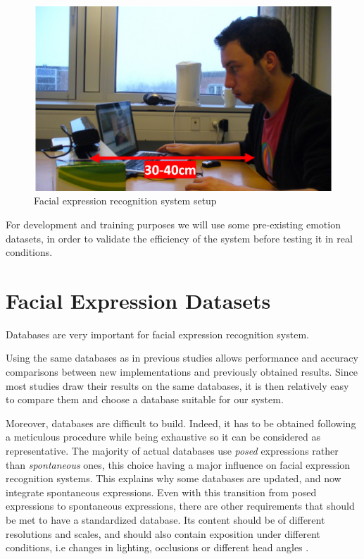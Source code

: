 \begin{figure}[!h]
\begin{center}
\noindent \includegraphics[scale=0.6]{figures/system_setup} 
\newline
\caption{Facial expression recognition system setup}
\label{system_setup}
\end{center} 
\end{figure}

\noindent For development and training purposes we will use some pre-existing emotion datasets, in order to validate the efficiency of the system before testing it in real conditions.
\newline

\section{Facial Expression Datasets}

\vspace{\baselineskip}
\noindent Databases are very important for facial expression recognition system.
\newline

\noindent Using the same databases as in previous studies allows performance and accuracy comparisons between new implementations and previously obtained results. Since most studies draw their results on the same databases, it is then relatively easy to compare them and choose a database suitable for our system.
\newline

\noindent Moreover, databases are difficult to build. Indeed, it has to be obtained following a meticulous procedure while being exhaustive so it can be considered as representative. The majority of actual databases use \textit{posed} expressions rather than \textit{spontaneous} ones, this choice having a major influence on facial expression recognition systems. This explains why some databases are updated, and now integrate spontaneous expressions. Even with this transition from posed expressions to spontaneous expressions, there are other requirements that should be met to have a standardized database. Its content should be of different resolutions and scales, and should also contain exposition under different conditions, i.e changes in lighting, occlusions or different head angles \cite{BET12}.  
\newline

